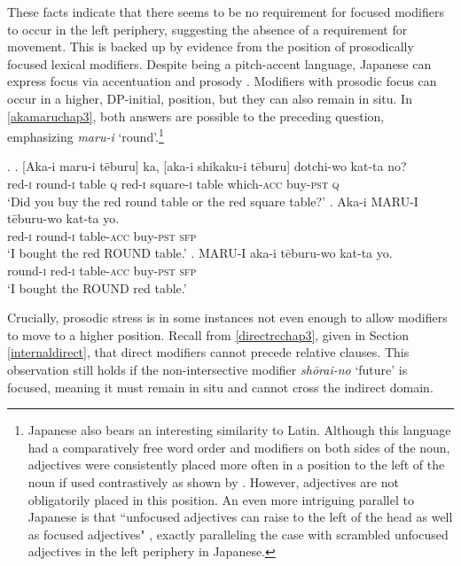 These facts indicate that there seems to be no requirement for focused modifiers to occur in the left periphery, suggesting the absence of a requirement for movement. This is backed up by evidence from the position of prosodically focused lexical modifiers. Despite being a pitch-accent language, Japanese can express focus via accentuation and prosody \citep{beckman:1986:intonational, hiraiwa:2012:syntactic, tomioka:2009:contrastive}. Modifiers with prosodic focus can occur in a higher, DP-initial, position, but they can also remain in situ. In \ref{akamaruchap3}, both answers are possible to the preceding question, emphasizing \textit{maru-i} `round’.\footnote{Japanese also bears an interesting similarity to Latin. Although this language had a comparatively free word order and modifiers on both sides of the noun, adjectives were consistently placed more often in a position to the left of the noun if used contrastively as shown by \citet{devine:2006:latin}. However, adjectives are not obligatorily placed in this position. An even more intriguing parallel to Japanese is that ``unfocused adjectives can raise to the left of the head as well as focused adjectives" \citep[409]{devine:2006:latin}, exactly paralleling the case with scrambled unfocused adjectives in the left periphery in Japanese.}  

\ex. \label{akamaruchap3} \ag. [Aka-i maru-i tēburu] ka, [aka-i shikaku-i tēburu] dotchi-wo kat-ta no?\\
red-\textsc{i} round-\textsc{i} table \textsc{q} red-\textsc{i} square-\textsc{i} table which-\textsc{acc} buy-\textsc{pst} \textsc{q}\\
`Did you buy the red round table or the red square table?'
\bg. Aka-i MARU-I tēburu-wo kat-ta yo.\\
red-\textsc{i} round-\textsc{i} table-\textsc{acc} buy-\textsc{pst} \textsc{sfp}\\
`I bought the red ROUND table.’
\cg. MARU-I aka-i tēburu-wo kat-ta yo.\\
round-\textsc{i} red-\textsc{i} table-\textsc{acc} buy-\textsc{pst} \textsc{sfp}\\
`I bought the ROUND red table.’

Crucially, prosodic stress is in some instances not even enough to allow modifiers to move to a higher position. Recall from \ref{directrcchap3}, given in Section \ref{internaldirect}, that direct modifiers cannot precede relative clauses. This observation still holds if the non-intersective modifier \textit{shōrai-no} `future' is focused, meaning it must remain in situ and cannot cross the indirect domain.

